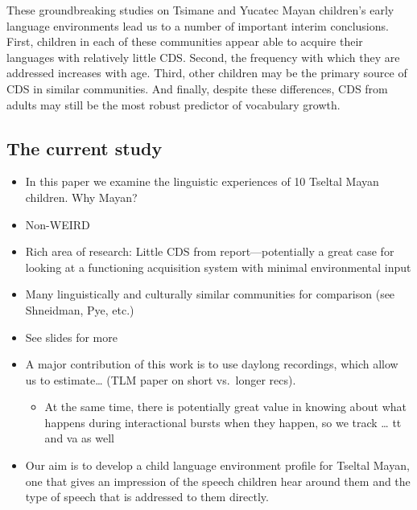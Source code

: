 \documentclass[man]{apa6}
\providecommand{\tightlist}{%
  \setlength{\itemsep}{0pt}\setlength{\parskip}{0pt}}
\theoremstyle{definition}
\theoremstyle{definition}
\theoremstyle{definition}
\theoremstyle{remark}
\begin{document}
These groundbreaking studies on Tsimane and Yucatec Mayan children's
early language environments lead us to a number of important interim
conclusions. First, children in each of these communities appear able to
acquire their languages with relatively little CDS. Second, the
frequency with which they are addressed increases with age. Third, other
children may be the primary source of CDS in similar communities. And
finally, despite these differences, CDS from adults may still be the
most robust predictor of vocabulary growth.

\subsection{The current study}\label{the-current-study}

\begin{itemize}
\tightlist
\item
  In this paper we examine the linguistic experiences of 10 Tseltal
  Mayan children. Why Mayan?
\item
  Non-WEIRD
\item
  Rich area of research: Little CDS from report---potentially a great
  case for looking at a functioning acquisition system with minimal
  environmental input
\item
  Many linguistically and culturally similar communities for comparison
  (see Shneidman, Pye, etc.)
\item
  See slides for more
\item
  A major contribution of this work is to use daylong recordings, which
  allow us to estimate\ldots{} (TLM paper on short vs.~longer recs).

  \begin{itemize}
  \tightlist
  \item
    At the same time, there is potentially great value in knowing about
    what happens during interactional bursts when they happen, so we
    track \ldots{} tt and va as well
  \end{itemize}
\item
  Our aim is to develop a child language environment profile for Tseltal
  Mayan, one that gives an impression of the speech children hear around
  them and the type of speech that is addressed to them directly. 
\end{itemize}
\end{document}
